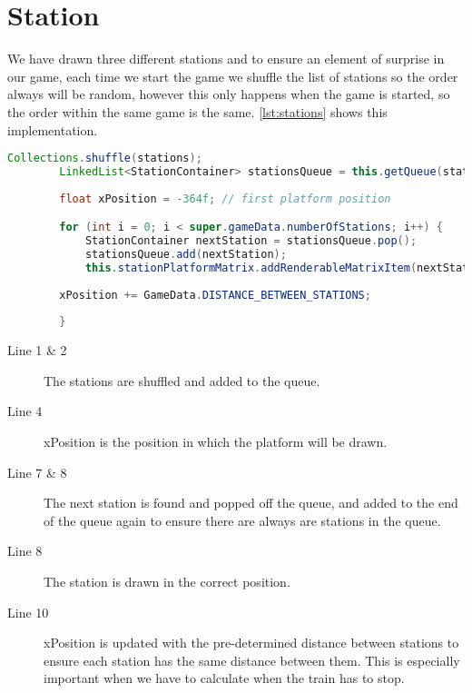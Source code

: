 \section{Station}

We have drawn three different stations and to ensure an element of surprise in our game, each time we start the game we shuffle the list of stations so the order always will be random, however this only happens when the game is started, so the order within the same game is the same.  \autoref{lst:stations} shows this implementation.
 
\begin{lstlisting}[language=java,firstnumber=1,caption={Smoke clouds getting reset based on time intervals},label=lst:stations]
        Collections.shuffle(stations);
        LinkedList<StationContainer> stationsQueue = this.getQueue(stations);
        
        float xPosition = -364f; // first platform position

        for (int i = 0; i < super.gameData.numberOfStations; i++) {
            StationContainer nextStation = stationsQueue.pop();
            stationsQueue.add(nextStation);
            this.stationPlatformMatrix.addRenderableMatrixItem(nextStation.station, new Coordinate(xPosition + nextStation.xOffset, nextStation.yOffset, 0f));
            
        xPosition += GameData.DISTANCE_BETWEEN_STATIONS;        
            
        }
\end{lstlisting}

\begin{description}
\item[Line 1 \& 2]  The stations are shuffled and added to the queue.
\item[Line 4] xPosition is the position in which the platform will be drawn. 
\item[Line 7 \& 8] The next station is found and popped off the queue, and added to the end of the queue again to ensure there are always are stations in the queue. 
\item[Line 8] The station is drawn in the correct position. 
\item[Line 10] xPosition is updated with the pre-determined distance between stations to ensure each station has the same distance between them. This is especially important when we have to calculate when the train has to stop. 
\end{description}

